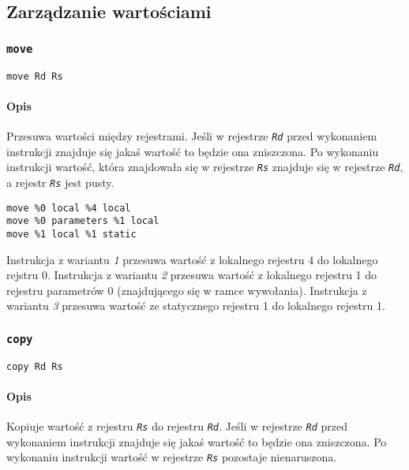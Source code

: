 \subsection{Zarządzanie wartościami}
\label{viua_vm_ops_value_management}

\subsubsection{\texttt{move}}
\label{viua_vm_ops_value_management_move}

\begin{lstlisting}
move Rd Rs
\end{lstlisting}

\paragraph*{Opis} Przesuwa wartości między rejestrami. Jeśli w rejestrze
\texttt{\emph{Rd}} przed wykonaniem instrukcji znajduje się jakaś wartość to
będzie ona zniszczona. Po wykonaniu instrukcji wartość, która znajdowała się w
rejestrze \texttt{\emph{Rs}} znajduje się w rejestrze \texttt{\emph{Rd}}, a
rejestr \texttt{\emph{Rs}} jest pusty.

\begin{lstlisting}
move %0 local %4 local
move %0 parameters %1 local
move %1 local %1 static
\end{lstlisting}

Instrukcja z wariantu \emph{1} przesuwa wartość z lokalnego rejestru 4 do
lokalnego rejstru 0.
Instrukcja z wariantu \emph{2} przesuwa wartość z lokalnego rejestru 1 do
rejestru parametrów 0 (znajdującego się w ramce wywołania).
Instrukcja z wariantu \emph{3} przesuwa wartość ze statycznego rejestru 1 do
lokalnego rejestru 1.

\subsubsection{\texttt{copy}}

\begin{lstlisting}
copy Rd Rs
\end{lstlisting}

\paragraph*{Opis} Kopiuje wartość z rejestru \texttt{\emph{Rs}} do rejestru
\texttt{\emph{Rd}}. Jeśli w rejestrze \texttt{\emph{Rd}} przed wykonaniem
instrukcji znajduje się jakaś wartość to będzie ona zniszczona. Po wykonaniu
instrukcji wartość w rejestrze \texttt{\emph{Rs}} pozostaje nienaruszona.

